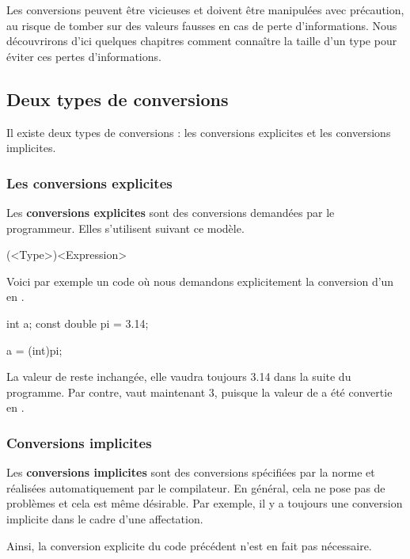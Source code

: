 Les conversions peuvent être vicieuses et doivent être manipulées avec
précaution, au risque de tomber sur des valeurs fausses en cas de perte
d'informations. Nous découvrirons d'ici quelques chapitres comment
connaître la taille d'un type pour éviter ces pertes d'informations.

\subsection{Deux types de conversions}
\label{deux-types-de-conversions}

Il existe deux types de conversions : les conversions explicites et les
conversions implicites.

\subsubsection*{Les conversions explicites}
\label{les-conversions-explicites}

Les \textbf{conversions explicites} sont des conversions demandées par
le programmeur. Elles s'utilisent suivant ce modèle.

\begin{C}
(<Type>)<Expression>
\end{C}

Voici par exemple un code où nous demandons explicitement la conversion
d'un  en .

\begin{C}
int a;
const double pi = 3.14;

a = (int)pi;
\end{C}

La valeur de  reste inchangée, elle vaudra toujours 3.14 dans
la suite du programme. Par contre,  vaut maintenant 3, puisque
la valeur de  a été convertie en .

\subsubsection*{Conversions implicites}
\label{conversions-implicites}

Les \textbf{conversions implicites} sont des conversions spécifiées par
la norme et réalisées automatiquement par le compilateur. En général,
cela ne pose pas de problèmes et cela est même désirable. Par exemple,
il y a toujours une conversion implicite dans le cadre d'une
affectation.

Ainsi, la conversion explicite du code précédent n'est en fait pas
nécessaire.

